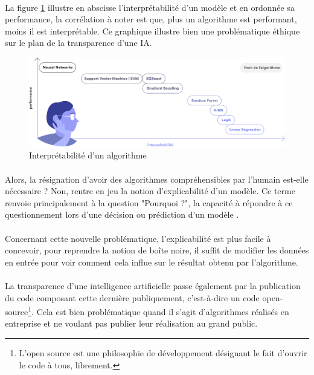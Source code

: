 \documentclass[10pt, french, a4paper]{report}
\begin{document}
\paragraph{}
La figure \ref{fig:interpretabilite_ia} illustre en abscisse l’interprétabilité d’un modèle et en ordonnée sa performance, la corrélation à noter est que, plus un algorithme est performant, moins il est interprétable. Ce graphique illustre bien une problématique éthique sur le plan de la transparence d’une IA.

\begin{figure}[hbt!]
    \centering
    \includegraphics[width=\textwidth]{images/interpretabilite_ia.png}
    \caption{Interprétabilité d'un algorithme \citep{data_for_good_serment_2018}}
    \label{fig:interpretabilite_ia}
\end{figure}

\paragraph{}
Alors, la résignation d’avoir des algorithmes compréhensibles par l’humain est-elle nécessaire ? Non, rentre en jeu la notion d’explicabilité d’un modèle. Ce terme renvoie principalement à la question "Pourquoi ?", la capacité à répondre à ce questionnement lors d’une décision ou prédiction d’un modèle \citep{gilpin_explaining_2018}.

\paragraph{}
Concernant cette nouvelle problématique, l’explicabilité est plus facile à concevoir, pour reprendre la notion de boîte noire, il suffit de modifier les données en entrée pour voir comment cela influe sur le résultat obtenu par l’algorithme.

\paragraph{}
La transparence d’une intelligence artificielle passe également par la publication du code composant cette dernière publiquement, c’est-à-dire un code open-source\footnote{L’open source est une philosophie de développement désignant le fait d’ouvrir le code à tous, librement.}. Cela est bien problématique quand il s’agit d’algorithmes réalisés en entreprise et ne voulant pas publier leur réalisation au grand public.
\end{document}
